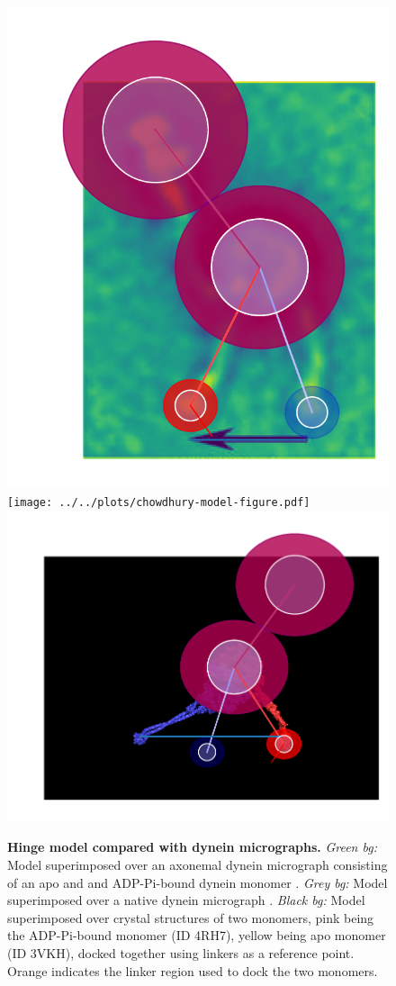 \documentclass[9pt,twocolumn,twoside]{pnas-new}
\begin{document}
\begin{figure}[tbhp]
\includegraphics[width=0.5\linewidth]{../../plots/burgess-model-figure.pdf}%
\texttt{[image: ../../plots/chowdhury-model-figure.pdf]}\\
\includegraphics[width=0.5\linewidth]{../../plots/crystal-model-figure.pdf}%
\caption{\textbf{Hinge model compared with dynein micrographs.} \textit{Green bg:} Model superimposed over an axonemal dynein micrograph consisting of an apo and and ADP-Pi-bound dynein monomer \cite{burgess-paper}. \textit{Grey bg:} Model superimposed over a native dynein micrograph \cite{nativestructure}. \textit{Black bg:} Model superimposed over crystal structures of two monomers, pink being the ADP-Pi-bound monomer (ID 4RH7), yellow being apo monomer (ID 3VKH), docked together using linkers as a reference point. Orange indicates the linker region used to dock the two monomers.}
\label{fig:duration-length}
\end{figure}
\end{document}
